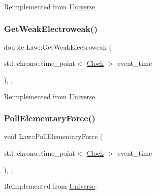 Reimplemented from \mbox{\hyperlink{classUniverse_a4476b7e0a3fc1764909f556257fd9ec7}{Universe}}.

\mbox{\label{classLaw_aad6e54da64a5d8499dcb6c232aa6748f}} 
\subsubsection{\texorpdfstring{Get\+Weak\+Electroweak()}{GetWeakElectroweak()}}
{\footnotesize\ttfamily double Law\+::\+Get\+Weak\+Electroweak (\begin{DoxyParamCaption}\item[{std\+::chrono\+::time\+\_\+point$<$ \mbox{\hyperlink{universe_8h_a0ef8d951d1ca5ab3cfaf7ab4c7a6fd80}{Clock}} $>$}]{event\+\_\+time }\end{DoxyParamCaption})\hspace{0.3cm}{\ttfamily [inline]}, {\ttfamily [final]}, {\ttfamily [virtual]}}



Reimplemented from \mbox{\hyperlink{classUniverse_a645299738e6b798a037f2a15a2e7cf4d}{Universe}}.

\mbox{\label{classLaw_af99520c95b2cd8af0af110b78b2288ef}} 
\subsubsection{\texorpdfstring{Poll\+Elementary\+Force()}{PollElementaryForce()}}
{\footnotesize\ttfamily void Law\+::\+Poll\+Elementary\+Force (\begin{DoxyParamCaption}\item[{std\+::chrono\+::time\+\_\+point$<$ \mbox{\hyperlink{universe_8h_a0ef8d951d1ca5ab3cfaf7ab4c7a6fd80}{Clock}} $>$}]{event\+\_\+time }\end{DoxyParamCaption})\hspace{0.3cm}{\ttfamily [inline]}, {\ttfamily [final]}, {\ttfamily [virtual]}}



Reimplemented from \mbox{\hyperlink{classUniverse_a0c485c504542409cbb5cfd8543c35b11}{Universe}}.

\mbox{\label{classLaw_a56541ec0b82b8a7c377ae2e6b444205c}} 
